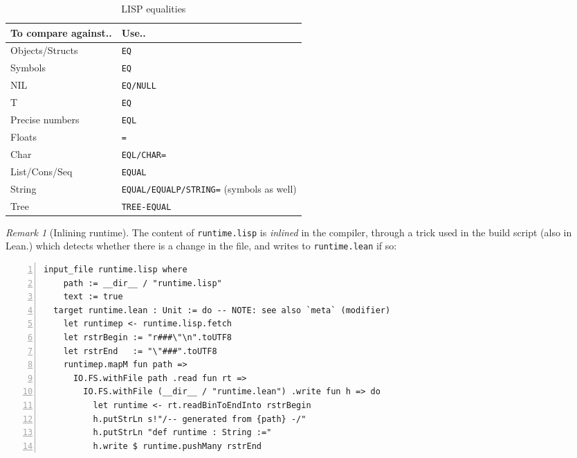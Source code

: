 \documentclass[a4paper, 11pt]{article}
\theoremstyle{remark}\newtheorem*{remark}{Remark}
\theoremstyle{definition}\newtheorem*{definition}{Definition}
\begin{document}
\begin{table}[]
\centering
\begin{tabular}{@{}ll@{}}
  \toprule
  \textbf{To compare against..} & \textbf{Use..}                               \\ \midrule
  Objects/Structs               & \texttt{EQ}                                         \\
  Symbols                       & \texttt{EQ}                                         \\
  NIL                           & \texttt{EQ/NULL}                                  \\
  T                             & \texttt{EQ}                                         \\
  Precise numbers               & \texttt{EQL}                                        \\
  Floats                        & \texttt{=}                                          \\
  Char                          & \texttt{EQL/CHAR=}                                \\
  List/Cons/Seq                 & \texttt{EQUAL}                                      \\
  String                        & \texttt{EQUAL/EQUALP/STRING=} (symbols as well) \\
  Tree                          & \texttt{TREE-EQUAL}                                 \\ \bottomrule
\end{tabular}
\caption{LISP equalities}\label{tab:lisp-eq}
\end{table}

\begin{remark}[Inlining runtime]
The content of \texttt{runtime.lisp} is \emph{inlined} in the compiler, through a trick
used in the build script (also in Lean.) which detects whether there is a change in the file, and
writes to \texttt{runtime.lean} if so:

\begin{Verbatim}[numbers=left]
  input_file runtime.lisp where
    path := __dir__ / "runtime.lisp"
    text := true
  target runtime.lean : Unit := do -- NOTE: see also `meta` (modifier)
    let runtimep <- runtime.lisp.fetch
    let rstrBegin := "r###\"\n".toUTF8
    let rstrEnd   := "\"###".toUTF8
    runtimep.mapM fun path =>
      IO.FS.withFile path .read fun rt =>
        IO.FS.withFile (__dir__ / "runtime.lean") .write fun h => do
          let runtime <- rt.readBinToEndInto rstrBegin
          h.putStrLn s!"/-- generated from {path} -/"
          h.putStrLn "def runtime : String :="
          h.write $ runtime.pushMany rstrEnd
\end{Verbatim}
\end{remark}
\end{document}
